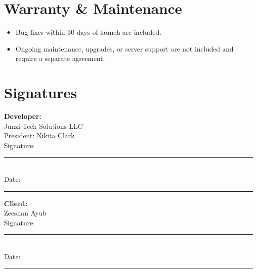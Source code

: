 \documentclass[11pt,letterpaper]{article}
\newcommand{\ClientName}{Zeeshan Ayub}
\begin{document}
\section{Warranty \& Maintenance}
\begin{itemize}[leftmargin=*]
\item Bug fixes within 30 days of launch are included.
\item Ongoing maintenance, upgrades, or server support are not included and require a separate agreement.
\end{itemize}

\vspace{2em}

\section*{Signatures}

\begin{minipage}{0.45\textwidth}
\textbf{Developer:}\\
Junzi Tech Solutions LLC\\
President: Nikita Clark\\[2em]
Signature: \rule{6cm}{0.4pt}\\[0.5em]
Date: \rule{4cm}{0.4pt}
\end{minipage}
\hfill
\begin{minipage}{0.45\textwidth}
\textbf{Client:}\\
\ClientName{}\\[3em]
Signature: \rule{6cm}{0.4pt}\\[0.5em]
Date: \rule{4cm}{0.4pt}
\end{minipage}
\end{document}
